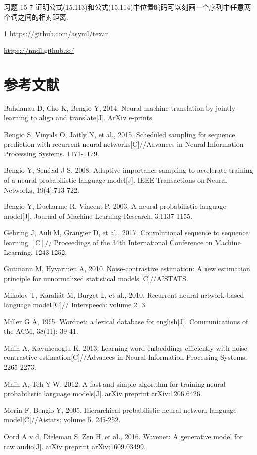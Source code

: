 \documentclass[10pt]{article}
\begin{document}
习题 15-7 证明公式(15.113)和公式(15.114)中位置编码可以刻画一个序列中任意两个词之间的相对距离.

1 \href{https://github.com/asyml/texar}{https://github.com/asyml/texar}

\href{https://nndl.github.io/}{https://nndl.github.io/}

\section*{参考文献}
Bahdanau D, Cho K, Bengio Y, 2014. Neural machine translation by jointly learning to align and translate[J]. ArXiv e-prints.

Bengio S, Vinyals O, Jaitly N, et al., 2015. Scheduled sampling for sequence prediction with recurrent neural networks[C]//Advances in Neural Information Processing Systems. 1171-1179.

Bengio Y, Senécal J S, 2008. Adaptive importance sampling to accelerate training of a neural probabilistic language model[J]. IEEE Transactions on Neural Networks, 19(4):713-722.

Bengio Y, Ducharme R, Vincent P, 2003. A neural probabilistic language model[J]. Journal of Machine Learning Research, 3:1137-1155.

Gehring J, Auli M, Grangier D, et al., 2017. Convolutional sequence to sequence learning $[\mathrm{C}] / /$ Proceedings of the 34th International Conference on Machine Learning. 1243-1252.

Gutmann M, Hyvärinen A, 2010. Noise-contrastive estimation: A new estimation principle for unnormalized statistical models.[C]//AISTATS.

Mikolov T, Karafiát M, Burget L, et al., 2010. Recurrent neural network based language model.[C]// Interspeech: volume 2. 3.

Miller G A, 1995. Wordnet: a lexical database for english[J]. Communications of the ACM, 38(11): 39-41.

Mnih A, Kavukcuoglu K, 2013. Learning word embeddings efficiently with noise-contrastive estimation[C]//Advances in Neural Information Processing Systems. 2265-2273.

Mnih A, Teh Y W, 2012. A fast and simple algorithm for training neural probabilistic language models[J]. arXiv preprint arXiv:1206.6426.

Morin F, Bengio Y, 2005. Hierarchical probabilistic neural network language model[C]//Aistats: volume 5. 246-252.

Oord A v d, Dieleman S, Zen H, et al., 2016. Wavenet: A generative model for raw audio[J]. arXiv preprint arXiv:1609.03499.
\end{document}
